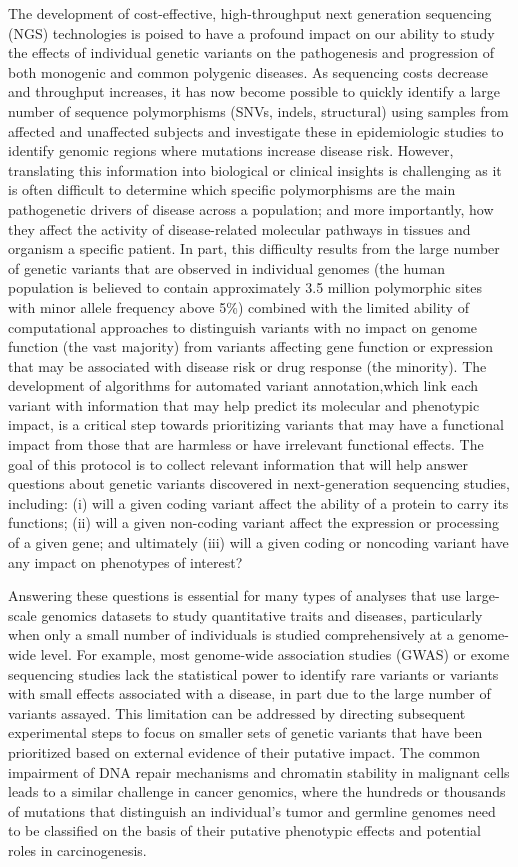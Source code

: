 The development of cost-effective, high-throughput next generation sequencing (NGS) technologies is poised to have a profound impact on our ability to study the effects of individual genetic variants on the pathogenesis and progression of both monogenic and common polygenic diseases. As sequencing costs decrease and throughput increases, it has now become possible to quickly identify a large number of sequence polymorphisms (SNVs, indels, structural) using samples from affected and unaffected subjects and investigate these in epidemiologic studies to identify genomic regions where mutations increase disease risk. However, translating this information into biological or clinical insights is challenging as it is often difficult to determine which specific polymorphisms are the main pathogenetic drivers of disease across a population; and more importantly, how they affect the activity of disease-related molecular pathways in tissues and organism a specific patient. In part, this difficulty results from the large number of genetic variants that are observed in individual genomes (the human population is believed to contain approximately 3.5 million polymorphic sites with minor allele frequency above 5\%) combined with the limited ability of computational approaches to distinguish variants with no impact on genome function (the vast majority) from variants affecting gene function or expression that may be associated with disease risk or drug response (the minority). The development of algorithms for automated variant annotation,which link each variant with information that may help predict its molecular and phenotypic impact, is a critical step towards prioritizing variants that may have a functional impact from those that are harmless or have irrelevant functional effects. The goal of this protocol is to collect relevant information that will help answer questions about genetic variants discovered in next-generation sequencing studies, including: (i) will a given coding variant affect the ability of a protein to carry its functions; (ii) will a given non-coding variant affect the expression or processing of a given gene; and ultimately (iii) will a given coding or noncoding variant have any impact on phenotypes of interest?

Answering these questions is essential for many types of analyses that use large-scale genomics datasets to study quantitative traits and diseases, particularly when only a small number of individuals is studied comprehensively at a genome-wide level. For example, most genome-wide association studies (GWAS) or exome sequencing studies lack the statistical power to identify rare variants or variants with small effects associated with a disease, in part due to the large number of variants assayed. This limitation can be addressed by directing subsequent experimental steps to focus on smaller sets of genetic variants that have been prioritized based on external evidence of their putative impact. The common impairment of DNA repair mechanisms and chromatin stability in malignant cells leads to a similar challenge in cancer genomics, where the hundreds or thousands of mutations that distinguish an individual’s tumor and germline genomes need to be classified on the basis of their putative phenotypic effects and potential roles in carcinogenesis.

